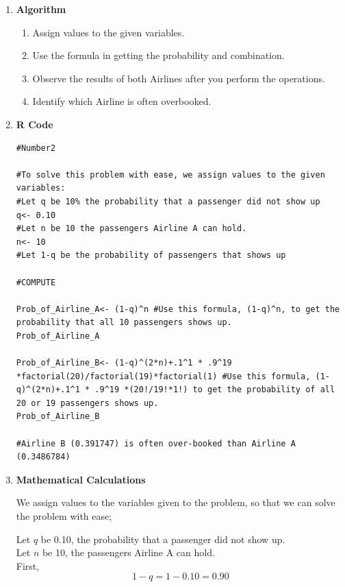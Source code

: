 \documentclass[12pt,letterpaper]{article}
\begin{document}
    \hspace*{0.5cm} \vspace*{0.5cm}
    \begin{enumerate}[label=\Alph*]
      \item \textbf{Algorithm}
      
        \begin{enumerate}[label=\arabic*.]
          \item Assign values to the given variables.
          \item Use the formula in getting the probability and combination.
          \item Observe the results of both Airlines after you perform the operations.
          \item Identify which Airline is often overbooked.
        \end{enumerate}

      \vspace*{0.5cm}
      \item \textbf{R Code}
      
        \begin{lstlisting}[title=\footnotesize Code 2.1: The Entire Cpde]
#Number2

#To solve this problem with ease, we assign values to the given variables:
#Let q be 10% the probability that a passenger did not show up
q<- 0.10
#Let n be 10 the passengers Airline A can hold.
n<- 10
#Let 1-q be the probability of passengers that shows up 

#COMPUTE

Prob_of_Airline_A<- (1-q)^n #Use this formula, (1-q)^n, to get the probability that all 10 passengers shows up.
Prob_of_Airline_A

Prob_of_Airline_B<- (1-q)^(2*n)+.1^1 * .9^19 *factorial(20)/factorial(19)*factorial(1) #Use this formula, (1-q)^(2*n)+.1^1 * .9^19 *(20!/19!*1!) to get the probability of all 20 or 19 passengers shows up.  
Prob_of_Airline_B

#Airline B (0.391747) is often over-booked than Airline A (0.3486784)
        \end{lstlisting}

      \vspace*{0.5cm}
      \item \textbf{Mathematical Calculations}
      
        We assign values to the variables given to the problem, so that we can solve the problem with ease;

        \hspace*{0.5cm} Let $q$ be 0.10, the probability that a passenger did not show up.\\
        \hspace*{0.5cm} Let $n$ be 10, the passengers Airline A can hold.\\
        First,
        \begin{equation*}
          1-q=1-0.10=0.90
        \end{equation*}


\end{enumerate}
\end{document}
